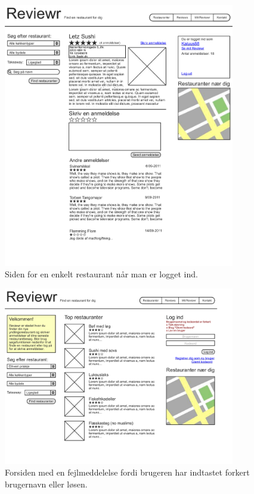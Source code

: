 \documentclass[a4paper, 12pt]{article}
\begin{document}
\begin{figure}[hp]
  \centering
  \includegraphics[width=0.9\textwidth]{mockup/page6.pdf}
  \caption{Siden for en enkelt restaurant når man er logget ind.}
\end{figure}

\begin{figure}[hp]
  \centering
  \includegraphics[width=0.9\textwidth]{mockup/page4.pdf}
  \caption{Forsiden med en fejlmeddelelse fordi brugeren har indtastet
    forkert brugernavn eller løsen.}
\end{figure}
\end{document}
